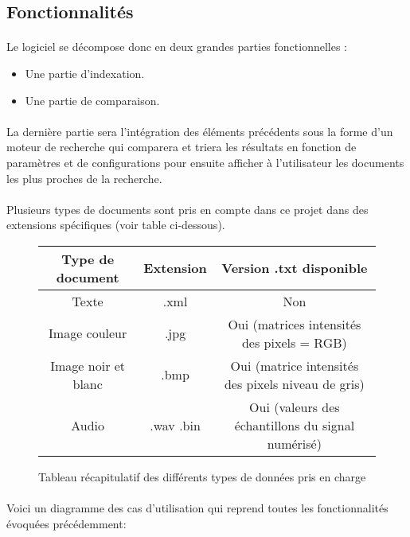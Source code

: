 \documentclass[../main.tex]{subfiles}
\begin{document}
    \subsection{Fonctionnalités}
    \paragraph{}
    Le logiciel se décompose donc en deux grandes parties fonctionnelles :
    \begin{itemize}
        \item Une partie d’indexation.
        \item Une partie de comparaison.
    \end{itemize}

    \paragraph{}
    La dernière partie sera l'intégration des éléments précédents sous la forme d’un moteur de recherche qui comparera et triera les résultats en fonction de paramètres et de configurations pour ensuite afficher à l’utilisateur les documents les plus proches de la recherche.

    \paragraph{}
    Plusieurs types de documents sont pris en compte dans ce projet dans des extensions spécifiques (voir table ci-dessous).  	

    \begin{figure}[h]
        \begin{center}
            \begin{tabular}{|c|c|c|}
                \hline
                \rowcolor{Gray}Type de document & Extension & Version .txt disponible \\
                \hline
                Texte & .xml & Non \\
                \hline
                Image couleur & .jpg & Oui (matrices intensités des pixels = RGB) \\
                \hline
                Image noir et blanc & .bmp & Oui (matrice intensités des pixels niveau de gris) \\
                \hline
                Audio & .wav .bin &  Oui (valeurs des échantillons du signal numérisé) \\
                \hline
            \end{tabular}
        \end{center}
        \caption{Tableau récapitulatif des différents types de données pris en charge}
    \end{figure}

    \paragraph{}
    Voici un diagramme des cas d’utilisation qui reprend toutes les fonctionnalités évoquées précédemment:
\end{document}
